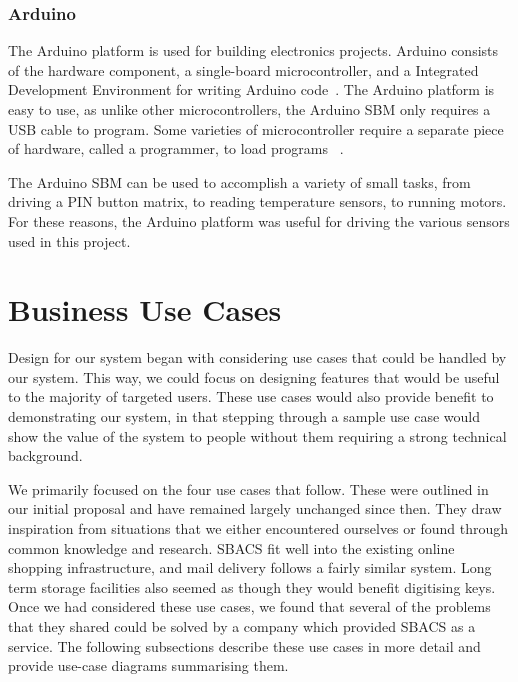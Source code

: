 \documentclass[12pt]{report}
\let\Oldsubsection\subsection
\renewcommand{\subsection}{\FloatBarrier\Oldsubsection}
\begin{document}
\subsection{Arduino} \label{arduino}

The Arduino platform is used for building electronics projects. Arduino consists of the hardware component, a 
single-board microcontroller, and a Integrated Development Environment for writing Arduino code~\autocite{WHATISARDUINO}. 
The Arduino platform is easy to use, as unlike other microcontrollers, the Arduino SBM only requires a USB cable to 
program. Some varieties of microcontroller require a separate piece of hardware, called a programmer, to load programs 
~\autocite{MCUPROGRAMMER}.

The Arduino SBM can be used to accomplish a variety of small tasks, from driving a PIN button matrix, to reading 
temperature sensors, to running motors. For these reasons, the Arduino platform was useful for driving the various 
sensors used in this project.


\chapter{Business Use Cases} \label{business-use-cases}

Design for our system began with considering use cases that could be handled by our system. This way, we could focus on 
designing features that would be useful to the majority of targeted users. These use cases would also provide benefit to demonstrating our system, in that stepping
through a sample use case would show the value of the system to people without them requiring a strong technical
background.

We primarily focused on the four use cases that follow. These were outlined in our initial proposal and have remained
largely unchanged since then. They draw inspiration from situations that we either encountered ourselves or found
through common knowledge and research. SBACS fit well into the existing online shopping infrastructure, and
mail delivery follows a fairly similar system. Long term storage facilities also seemed as though they
would benefit digitising keys. Once we had considered these use cases, we found that several of
the problems that they shared could be solved by a company which provided SBACS as a service. The following subsections
describe these use cases in more detail and provide use-case diagrams summarising them.
\end{document}
